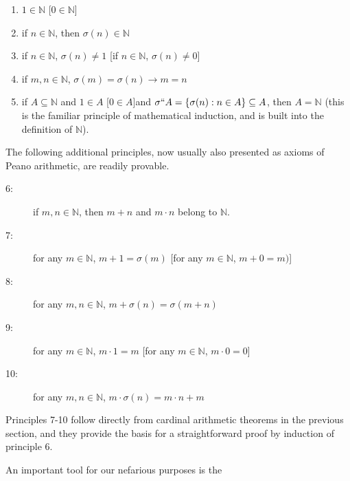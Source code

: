 \documentclass[12pt]{article}
\begin{document}
\begin{enumerate}

\item $1 \in \mathbb N$ [$0 \in \mathbb N$]

\item  if $n \in \mathbb N$, then $\sigma(n) \in \mathbb N$

\item  if $n \in \mathbb N$, $\sigma(n) \neq 1$  [if $n \in \mathbb N$, $\sigma(n) \neq 0$]

\item  if $m,n \in \mathbb N$, $\sigma(m)=\sigma(n) \rightarrow m=n$

\item if $A \subseteq \mathbb N$ and $1 \in A$ [$0\in A$]and $\sigma``A = \{\sigma(n):n \in A\} \subseteq A$, then $A=\mathbb N$ (this is the familiar principle of mathematical induction, and is built into the definition of $\mathbb N$).

\end{enumerate}

The following additional principles, now usually also presented as axioms of Peano arithmetic, are readily provable.

\begin{description}
 \item[6:]  if $m,n \in \mathbb N$, then $m+n$ and $m \cdot n$ belong to $\mathbb N$.

\item[7:]   for any $m \in \mathbb N$, $m+1=\sigma(m)$ [for any $m \in \mathbb N$, $m+0=m)$]

\item[8:]  for any $m,n \in \mathbb N$, $m+\sigma(n) = \sigma(m+n)$

\item[9:]  for any $m \in \mathbb N$, $m \cdot 1 = m$  [for any $m \in \mathbb N$, $m \cdot 0 = 0$]

\item[10:]  for any $m,n \in \mathbb N$, $m \cdot \sigma(n) = m \cdot n + m$

\end{description}

Principles 7-10 follow directly from cardinal arithmetic theorems in the previous section, and they provide the basis for a straightforward proof by induction of principle 6.

An important tool for our nefarious purposes is the
\end{document}
